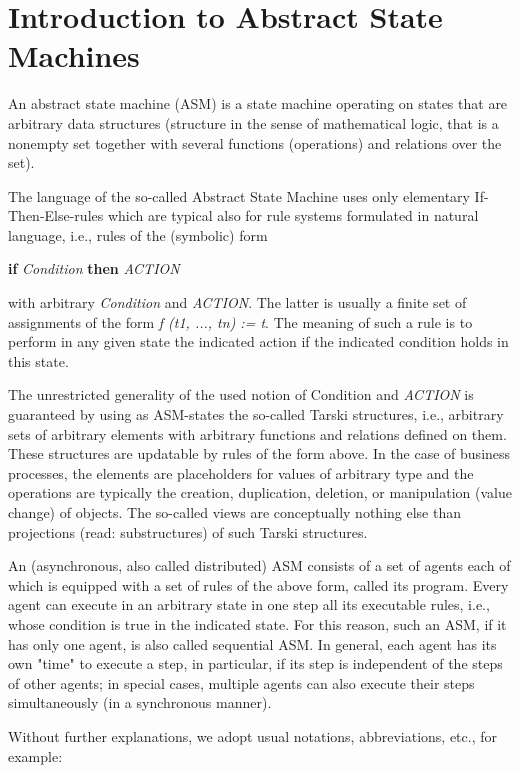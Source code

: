 \section{Introduction to Abstract State Machines }

An abstract state machine (ASM) is a state machine operating on states that are arbitrary data structures (structure in the sense of mathematical logic, that is a nonempty set together with several functions (operations) and relations over the set).

The language of the so-called Abstract State Machine uses only elementary If-Then-Else-rules which are typical also for rule systems formulated in natural language, i.e., rules of the (symbolic) form 

\medskip
\textbf{if} \textit{Condition} \textbf{then} \textit{ACTION}
\medskip

with arbitrary \textit{Condition} and \textit{ACTION}. The latter is usually a finite set of assignments of the form \textit{f (t1, ..., tn) := t}. The meaning of such a rule is to perform in any given state the indicated action if the indicated condition holds in this state.

The unrestricted generality of the used notion of Condition and \textit{ACTION} is guaranteed by using as ASM-states the so-called Tarski structures, i.e., arbitrary sets of arbitrary elements with arbitrary functions and relations defined on them. These structures are updatable by rules of the form above. In the case of business processes, the elements are placeholders for values of arbitrary type and the operations are typically the creation, duplication, deletion, or manipulation (value change) of objects. The so-called views are conceptually nothing else than projections (read: substructures) of such Tarski structures.

An (asynchronous, also called distributed) ASM consists of a set of agents each of which is equipped with a set of rules of the above form, called its program. Every agent can execute in an arbitrary state in one step all its executable rules, i.e., whose condition is true in the indicated state. For this reason, such an ASM, if it has only one agent, is also called sequential ASM. In general, each agent has its own "time" to execute a step, in particular, if its step is independent of the steps of other agents;  in special cases, multiple agents can also execute their steps simultaneously (in a synchronous manner).

Without further explanations, we adopt usual notations, abbreviations, etc., for example:

